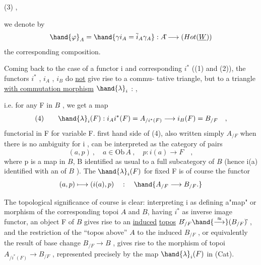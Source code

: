 
(3) \hfill ,

we denote by
\[ \hand{\varphi}_A= \hand{\gamma i_A = \overline{i}_A\gamma_A} : A\hat{} \longrightarrow (Hot(\underline{W})) \]
the corresponding composition.

Coming back to the case of a functor i and corresponding $i^*$
((1) and (2)), the functors $i^*$ , $i_A$ , $i_B$ do \uline{not} give rise to a commu-%
tative triangle, but to a triangle \uline{with commutation morphism} $\hand{\lambda}_i$ :
\hfill ,

i.e. for any F in $B\hat{}$ , we get a map 
\[ (4) \qquad \hand{\lambda}_i(F) : i_Ai^*(F) = A_{/i^{*}(F)} \longrightarrow i_B(F) = B_{/F} \quad , \]
functorial in F for variable F.  first hand side of (4), also
written simply $A_{/F}$ when there is no ambiguity for i ,  can be
interpreted as the category of pairs
\[ (a,p) \ , \quad a \in \mathrm{Ob}\, A \ , \quad p: i(a) \to F \quad , \]
where p is a map in $B\hat{}$, B identified as usual to a full subcategory of
$B\hat{}$ (hence i(a) identified with an  of $B\hat{}$ ). The   $\hand{\lambda}_i(F)$
for fixed F is of course the  functor
\[ (a,p) \longmapsto (i(a),p) \quad : \quad \hand{A_{/F} \longrightarrow B_{/F} .} \]

The topological significance of course is clear: interpreting i as
defining a"map" or morphism of the corresponding topoi $A\hat{}$ and $B\hat{}$, having
$i^*$ as inverse image functor, an object F of $B\hat{}$ gives rise to an \uline{induced}
\uline{topos} $B\hat{}_{/F} \hand{\overset{\approx}{\longrightarrow}} (B_{/F})\hat{}$ , and the restriction of the ``topos above'' $A\hat{}$
to the induced $B\hat{}_{/F}$ , or equivalently the result of base change
$B\hat{}_{/F} \to B\hat{}$ , gives rise to the  morphism of topoi $A\hat{}_{/i^*(F)} \longrightarrow B\hat{}_{/F}$ ,
represented precisely by the map $\hand{\lambda}_i(F)$ in (Cat).

